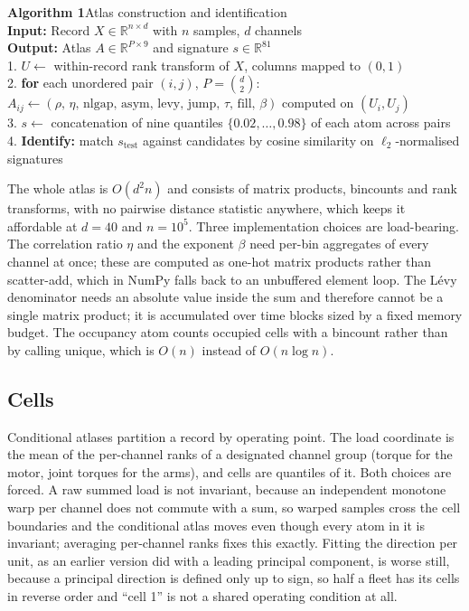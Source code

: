 \documentclass[11pt]{article}
\newcommand{\levy}{\mathrm{levy}}
\begin{document}
\noindent\begin{minipage}{0.92\textwidth}
\small\ttfamily
\textbf{Algorithm 1}\quad Atlas construction and identification\\[4pt]
\textbf{Input:} Record $X \in \mathbb{R}^{n \times d}$ with $n$ samples, $d$ channels\\[2pt]
\textbf{Output:} Atlas $A \in \mathbb{R}^{P \times 9}$ and signature $s \in \mathbb{R}^{81}$\\[6pt]
1.\; $U \leftarrow$ within-record rank transform of $X$, columns mapped to $(0,1)$\\[1pt]
2.\; \textbf{for} each unordered pair $(i,j)$, $P = \binom{d}{2}$:\\[1pt]
\quad $A_{ij} \leftarrow (\rho,\, \eta,\, \mathrm{nlgap},\, \mathrm{asym},\, \levy,\, \mathrm{jump},\, \tau,\, \mathrm{fill},\, \beta)$ computed on $(U_i, U_j)$\\[1pt]
3.\; $s \leftarrow$ concatenation of nine quantiles $\{0.02,\ldots,0.98\}$ of each atom across pairs\\[1pt]
4.\; \textbf{Identify:} match $s_{\mathrm{test}}$ against candidates by cosine similarity on $\ell_2$-normalised signatures
\end{minipage}

The whole atlas is $O(d^2 n)$ and consists of matrix products, bincounts and
rank transforms, with no pairwise distance statistic anywhere, which keeps it
affordable at $d = 40$ and $n = 10^5$. Three implementation choices are
load-bearing. The correlation ratio $\eta$ and the exponent $\beta$ need
per-bin aggregates of every channel at once; these are computed as one-hot
matrix products rather than scatter-add, which in NumPy falls back to an
unbuffered element loop. The L\'evy denominator needs an absolute value inside
the sum and therefore cannot be a single matrix product; it is accumulated
over time blocks sized by a fixed memory budget. The occupancy atom counts
occupied cells with a bincount rather than by calling unique, which is
$O(n)$ instead of $O(n\log n)$.

\subsection{Cells}

Conditional atlases partition a record by operating point. The load coordinate
is the mean of the per-channel ranks of a designated channel group (torque for
the motor, joint torques for the arms), and cells are quantiles of it. Both
choices are forced. A raw summed load is not invariant, because an independent
monotone warp per channel does not commute with a sum, so warped samples cross
the cell boundaries and the conditional atlas moves even though every atom in
it is invariant; averaging per-channel ranks fixes this exactly. Fitting the
direction per unit, as an earlier version did with a leading principal
component, is worse still, because a principal direction is defined only up to
sign, so half a fleet has its cells in reverse order and ``cell 1'' is not a
shared operating condition at all.
\end{document}
